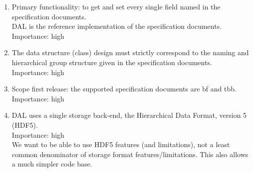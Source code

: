 \documentclass[a4paper,11pt]{article}
\begin{document}
\begin{enumerate}[label=\it R.\arabic{*}]
\itemsep0em

\item \label{req:getset-fields} Primary functionality: to get and set every single field named in the specification documents.\\
DAL is the reference implementation of the specification documents.\\
Importance: high\\

\item \label{req:data_struc_design} The data structure (class) design must strictly correspond to the naming and hierarchical group structure given in the specification documents.\\
Importance: high\\

\item \label{req:scope_1st_release} Scope first release: the supported specification documents are bf and tbb.\\
Importance: high\\

\item \label{req:storage_backend} DAL uses a single storage back-end, the Hierarchical Data Format, version 5 (HDF5).\\
Importance: high\\
We want to be able to use HDF5 features (and limitations), not a least common denominator of storage format features/limitations.
This also allows a much simpler code base.


\end{enumerate}
\end{document}
